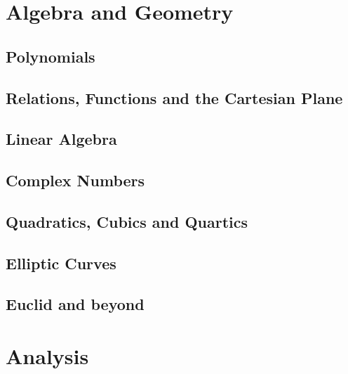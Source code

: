 \documentclass{scrbook}
\begin{document}
\part{Algebra and Geometry}

\chapter{Polynomials} %

\chapter{Relations, Functions and the Cartesian Plane} %

\chapter{Linear Algebra} %

\chapter{Complex Numbers} %

\chapter{Quadratics, Cubics and Quartics} %

\chapter{Elliptic Curves} %

\chapter{Euclid and beyond} %

\part{Analysis}
\end{document}
